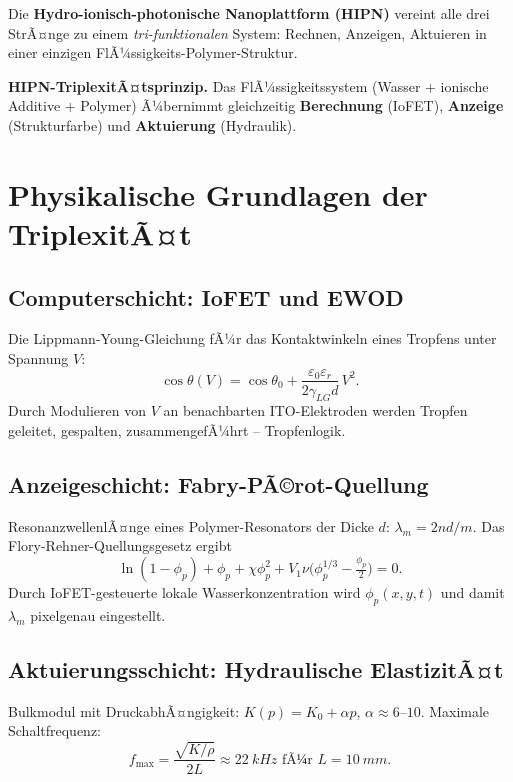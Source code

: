 ﻿\documentclass[a4paper,12pt]{scrreprt}
\theoremstyle{definition}
\begin{document}
Die \textbf{Hydro-ionisch-photonische Nanoplattform (HIPN)} vereint
alle drei StrÃ¤nge zu einem \emph{tri-funktionalen} System: Rechnen,
Anzeigen, Aktuieren in einer einzigen FlÃ¼ssigkeits-Polymer-Struktur.

\begin{infobox}
\textbf{HIPN-TriplexitÃ¤tsprinzip.} Das FlÃ¼ssigkeitssystem (Wasser +
ionische Additive + Polymer) Ã¼bernimmt gleichzeitig
\textbf{Berechnung} (IoFET), \textbf{Anzeige} (Strukturfarbe) und
\textbf{Aktuierung} (Hydraulik).
\end{infobox}

\section{Physikalische Grundlagen der TriplexitÃ¤t}

\subsection{Computerschicht: IoFET und EWOD}

Die Lippmann-Young-Gleichung fÃ¼r das Kontaktwinkeln eines Tropfens
unter Spannung $V$:
\[
  \cos\theta(V) = \cos\theta_0 + \frac{\varepsilon_0\varepsilon_r}{2\gamma_{LG}d}\,V^2.
\]
Durch Modulieren von $V$ an benachbarten ITO-Elektroden werden Tropfen
geleitet, gespalten, zusammengefÃ¼hrt -- Tropfenlogik.

\subsection{Anzeigeschicht: Fabry-PÃ©rot-Quellung}

ResonanzwellenlÃ¤nge eines Polymer-Resonators der Dicke $d$:
$\lambda_m = 2nd/m$. Das Flory-Rehner-Quellungsgesetz ergibt
\[
  \ln(1-\phi_p)+\phi_p+\chi\phi_p^2
  + V_1\nu\bigl(\phi_p^{1/3}-\tfrac{\phi_p}{2}\bigr)=0.
\]
Durch IoFET-gesteuerte lokale Wasserkonzentration wird $\phi_p(x,y,t)$
und damit $\lambda_m$ pixelgenau eingestellt.

\subsection{Aktuierungsschicht: Hydraulische ElastizitÃ¤t}

Bulkmodul mit DruckabhÃ¤ngigkeit: $K(p) = K_0 + \alpha p$,
$\alpha \approx 6$--$10$. Maximale Schaltfrequenz:
\[
  f_{\max} = \frac{\sqrt{K/\rho}}{2L} \approx \SI{22}{kHz}
  \text{ fÃ¼r } L=\SI{10}{mm}.
\]
\end{document}
